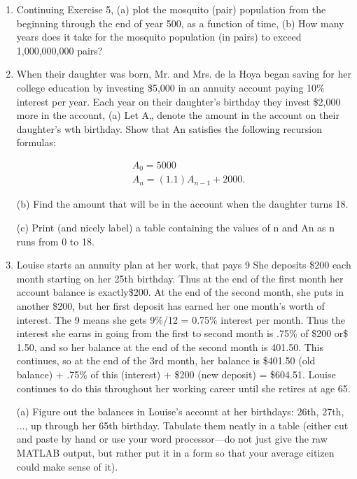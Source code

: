 \documentclass[../main.tex]{subfiles}
\begin{document}
\begin{enumerate}
\item Continuing Exercise 5, (a) plot the mosquito (pair) population from the beginning through the 
end of year 500, as a function of time, (b) How many years does it take for the mosquito 
population (in pairs) to exceed 1,000,000,000 pairs? 

\item When their daughter was born, Mr. and Mrs. de la Hoya began saving for her college education 
by investing \$5,000 in an annuity account paying 10\% interest per year. Each year on their 
daughter's birthday they invest \$2,000 more in the account, (a) Let A„ denote the amount in 
the account on their daughter's wth birthday. Show that An satisfies the following recursion 
formulas: 

\begin{equation}
\begin{aligned}
&A_{0}=5000 \\
&A_{n}=(1.1) A_{n-1}+2000 .
\end{aligned}
\end{equation}

(b) Find the amount that will be in the account when the daughter turns 18. 

(c) Print (and nicely label) a table containing the values of n and An as n runs from 0 to 18.

\item Louise starts an annuity plan at her work, that pays 9%
She deposits \$200 each month starting on her 25th birthday. Thus at the end of the first month 
her account balance is exactly\$200. At the end of the second month, she puts in another \$200, 
but her first deposit has earned her one month's worth of interest. The 9%
means she gets 9\%/12 = 0.75\% interest per month. Thus the interest she earns in going from the 
first to second month is .75\% of \$200 or\$ 1.50, and so her balance at the end of the second 
month is 401.50. This continues, so at the end of the 3rd month, her balance is \$401.50 (old balance) + .75\% of this (interest) + \$200 (new deposit) = \$604.51. Louise continues to do this 
throughout her working career until she retires at age 65. 

(a) Figure out the balances in Louise's account at her birthdays: 26th, 27th, ..., up through her 
65th birthday. Tabulate them neatly in a table (either cut and paste by hand or use your word 
processor—do not just give the raw MATLAB output, but rather put it in a form so that your 
average citizen could make sense of it). 


\end{enumerate}
\end{document}
